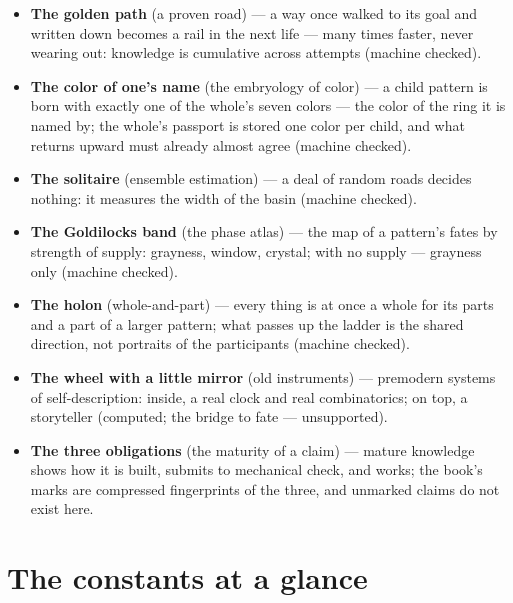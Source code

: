 \documentclass[11pt,letterpaper]{article}
\begin{document}
\begin{itemize}[leftmargin=1.4em, itemsep=1pt, parsep=0pt]
    a road is cursed but because the world has a beat: the same
    road is lethal in one phase and safe in another; what is worth
    carrying out of a lost attempt is the shape of that time, not
    its phase (machine checked).
  \item \textbf{The golden path} (a proven road) --- a way once
    walked to its goal and written down becomes a rail in the next
    life --- many times faster, never wearing out: knowledge is
    cumulative across attempts (machine checked).
  \item \textbf{The color of one's name} (the embryology of color)
    --- a child pattern is born with exactly one of the whole's
    seven colors --- the color of the ring it is named by; the
    whole's passport is stored one color per child, and what
    returns upward must already almost agree (machine checked).
  \item \textbf{The solitaire} (ensemble estimation) --- a deal of
    random roads decides nothing: it measures the width of the
    basin (machine checked).
  \item \textbf{The Goldilocks band} (the phase atlas) --- the map
    of a pattern's fates by strength of supply: grayness, window,
    crystal; with no supply --- grayness only (machine checked).
  \item \textbf{The holon} (whole-and-part) --- every thing is at
    once a whole for its parts and a part of a larger pattern; what
    passes up the ladder is the shared direction, not portraits of
    the participants (machine checked).
  \item \textbf{The wheel with a little mirror} (old instruments)
    --- premodern systems of self-description: inside, a real clock
    and real combinatorics; on top, a storyteller (computed; the
    bridge to fate --- unsupported).
  \item \textbf{The three obligations} (the maturity of a claim)
    --- mature knowledge shows how it is built, submits to
    mechanical check, and works; the book's marks are compressed
    fingerprints of the three, and unmarked claims do not exist
    here.
\end{itemize}

\section*{The constants at a glance}
\end{document}
